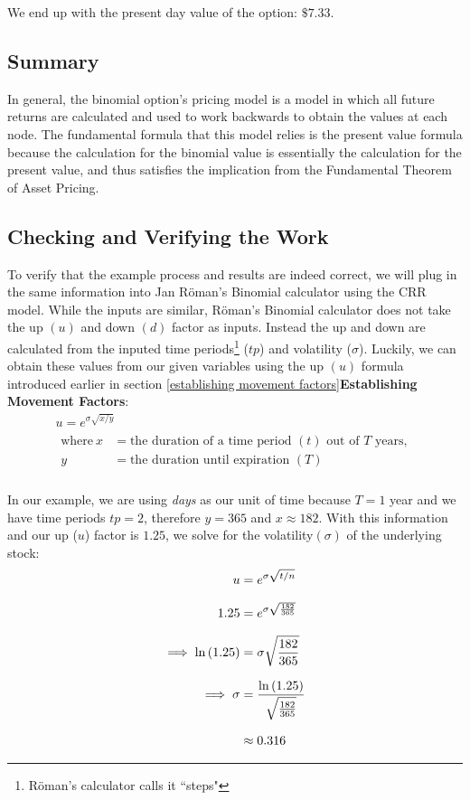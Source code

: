 \documentclass[12pt, letterpaper]{article}\usepackage{float}
\begin{document}
\noindent We end up with the present day value of the option: ${\$7.33}$.

\subsection*{Summary}
In general, the binomial option's pricing model is a model in which all future returns are calculated and used to work backwards to obtain the values at each node.
The fundamental formula that this model relies is the present value formula because the calculation for the binomial value is essentially the calculation for the present value, and thus satisfies the implication from the Fundamental Theorem of Asset Pricing\cite{blythevideo}.

\pagebreak
\subsection*{Checking and Verifying the Work}
To verify that the example process and results are indeed correct, we will plug in the same information into Jan R\"{o}man's Binomial calculator using the CRR model\cite{romancalc}.
While the inputs are similar, R\"{o}man's Binomial calculator does not take the up ${(u)}$ and down ${(d)}$ factor as inputs.
Instead the up and down are calculated from the inputed time periods\footnote{R\"{o}man's calculator calls it ``steps"} (${tp}$) and volatility (${\sigma}$).
Luckily, we can obtain these values from our given variables using the up ${(u)}$ formula introduced earlier in section \ref{establishing movement factors}{\textbf{Establishing Movement Factors}}:
\begin{gather*}
  u = e^{\sigma\sqrt{x/y}} \\
  \begin{align*}
    \text{where}~x &= \text{the duration of a time period ${(t)}$ out of ${T}$ years}, \\
    y &= \text{the duration until expiration ${(T)}$}
  \end{align*} \\
\end{gather*}

In our example, we are using \textit{days} as our unit of time because ${T=1}$ year and we have time periods ${tp=2}$, therefore ${y = 365}$ and ${x \approx 182}$. With this information and our up (${u}$) factor is ${1.25}$, we solve for the volatility${(\sigma)}$ of the underlying stock:
\begin{equation*}
  \setlength{\jot}{10pt}
  \begin{split}
    u
    & = e^{\sigma\sqrt{t/n}} \\
    1.25
    & = e^{\sigma\sqrt{\frac{182}{365}}} \\
    \implies \ln{(1.25)} &= \sigma\sqrt{\frac{182}{365}} \\
    \implies \sigma &= \frac{\ln{(1.25)}}{\sqrt{\frac{182}{365}}} \\
    & \approx 0.316
  \end{split}
\end{equation*}
\end{document}
